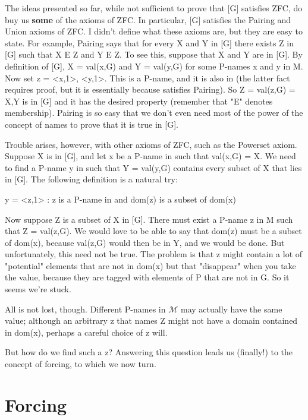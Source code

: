 \documentclass[10pt]{article}
\theoremstyle{definition}
\begin{document}
The ideas presented so far, while not sufficient to prove that [G]
satisfies ZFC, do buy us \textbf{some} of the axioms of ZFC.  In particular, [G]
satisfies the Pairing and Union axioms of ZFC.  I didn't define what these
axioms are, but they are easy to state.  For example, Pairing says that for
every X and Y in [G] there exists Z in [G] such that X E Z and Y E Z.  To
see this, suppose that X and Y are in [G].  By definition of [G],
X = val(x,G) and Y = val(y,G) for some P-names x and y in M.  Now set
z = {<x,1>, <y,1>}.  This is a P-name, and it is also in  (the latter
fact requires proof, but it is essentially because  satisfies Pairing).
So Z = val(z,G) = {X,Y} is in [G] and it has the desired property (remember
that "E" denotes membership).  Pairing is so easy that we don't even need
most of the power of the concept of names to prove that it is true in [G].

Trouble arises, however, with other axioms of ZFC, such as the Powerset
axiom.  Suppose X is in [G], and let x be a P-name in  such that
val(x,G) = X.  We need to find a P-name y in  such that Y = val(y,G)
contains every subset of X that lies in [G].  The following definition
is a natural try:

   y = {<z,1> : z is a P-name in  and dom(z) is a subset
                of dom(x)}

Now suppose Z is a subset of X in [G].  There must exist a P-name z in M
such that Z = val(z,G).  We would love to be able to say that dom(z) must be
a subset of dom(x), because val(z,G) would then be in Y, and we would be
done.  But unfortunately, this need not be true.  The problem is that z
might contain a lot of "potential" elements that are not in dom(x) but that
"disappear" when you take the value, because they are tagged with elements
of P that are not in G.  So it seems we're stuck.

All is not lost, though.  Different P-names in $\mathcal{M}$ may actually have the same
value; although an arbitrary z that names Z might not have a domain
contained in dom(x), perhaps a careful choice of z will.

But how do we find such a z?  Answering this question leads us (finally!) to
the concept of forcing, to which we now turn.


\section{Forcing}
\end{document}
